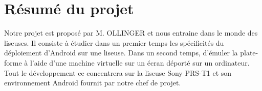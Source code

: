 \chapter{Résumé du projet}

Notre projet est proposé par M. OLLINGER et nous entraine dans le monde des liseuses. Il consiste à étudier dans un premier temps les spécificités du déploiement d'Android sur une liseuse. Dans un second temps, d'émuler la plate-forme à l'aide d'une machine virtuelle sur un écran déporté sur un ordinateur. Tout le développement ce concentrera sur la liseuse Sony PRS-T1 et son environnement Android fournit par notre chef de projet. 

